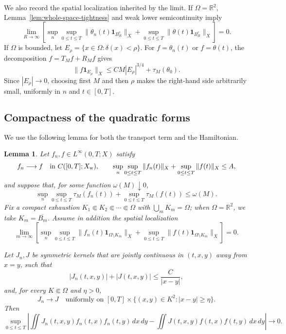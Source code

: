 \documentclass[11pt,reqno]{amsproc}
\newtheorem{lemma}{Lemma}[section]
\newcommand{\R}{\mathbb R}
\newcommand{\Om}{\Omega}
\newcommand{\one}{\mathbf 1}
\newcommand{\dd}{\,d}
\begin{document}
We also record the spatial localization inherited by the limit.  If
$\Om=\R^2$, Lemma~\ref{lem:whole-space-tightness} and weak lower
semicontinuity imply
\begin{equation}\label{eq:limit-spatial-tightness}
 \lim_{R\to\infty}
 \left[
  \sup_n\sup_{0\leq t\leq T}
  \|\theta_n(t)\one_{B_R^c}\|_X
  +\sup_{0\leq t\leq T}
  \|\theta(t)\one_{B_R^c}\|_X
 \right]=0.
\end{equation}
If $\Om$ is bounded, let $E_\rho=\{x\in\Om:\delta(x)<\rho\}$.  For
$f=\theta_n(t)$ or $f=\theta(t)$, the decomposition
$f=T_Mf+R_Mf$ gives
\begin{equation}\label{eq:boundary-layer-tightness}
  \|f\one_{E_\rho}\|_X
  \leq C M|E_\rho|^{3/4}+\tau_M(\theta_0).
\end{equation}
Since $|E_\rho|\to0$, choosing first $M$ and then $\rho$ makes the
right-hand side arbitrarily small, uniformly in $n$ and $t\in[0,T]$.

\subsection{Compactness of the quadratic forms}

We use the following lemma for both the transport term and the Hamiltonian.

\begin{lemma}
\label{lem:critical-quadratic-compactness}
Let $f_n,f\in L^\infty(0,T;X)$ satisfy
\[
  f_n\longrightarrow f\quad\text{in }C([0,T];X_{\rm w}),
  \qquad
  \sup_n\sup_{0\leq t\leq T}\|f_n(t)\|_X
  +\sup_{0\leq t\leq T}\|f(t)\|_X\leq A,
\]
and suppose that, for some function $\omega(M)\downarrow0$,
\[
  \sup_n\sup_{0\leq t\leq T}\tau_M(f_n(t))
  +\sup_{0\leq t\leq T}\tau_M(f(t))\leq\omega(M).
\]
Fix a compact exhaustion $K_1\Subset K_2\Subset\cdots\Subset\Om$ with
$\bigcup_mK_m=\Om$; when $\Om=\R^2$, we take $K_m=\overline{B_m}$.
Assume in addition the spatial localization
\begin{equation}\label{eq:abstract-spatial-localization}
 \lim_{m\to\infty}
 \left[
  \sup_n\sup_{0\leq t\leq T}\|f_n(t)\one_{\Om\setminus K_m}\|_X
  +\sup_{0\leq t\leq T}\|f(t)\one_{\Om\setminus K_m}\|_X
 \right]=0.
\end{equation}

Let $J_n,J$ be symmetric kernels that are jointly continuous in
$(t,x,y)$ away from $x=y$,
such that
\begin{equation}\label{eq:abstract-critical-kernel-bound}
  |J_n(t,x,y)|+|J(t,x,y)|\leq\frac{C}{|x-y|},
\end{equation}
and, for every $K\Subset\Om$ and $\eta>0$,
\[
  J_n\longrightarrow J
  \quad\text{uniformly on }
  [0,T]\times\{(x,y)\in K^2:|x-y|\geq\eta\}.
\]
Then
\begin{equation}\label{eq:abstract-quadratic-convergence}
 \sup_{0\leq t\leq T}
 \left|
  \iint J_n(t,x,y)f_n(t,x)f_n(t,y)\dd x\dd y
  -\iint J(t,x,y)f(t,x)f(t,y)\dd x\dd y
 \right|\longrightarrow0.
\end{equation}
\end{lemma}
\end{document}
